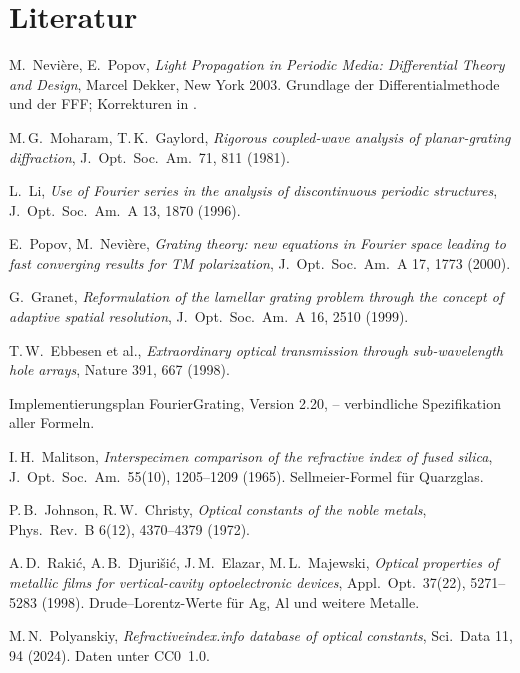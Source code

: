 \chapter{Literatur}\label{anh:literatur}
\begin{enumerate}[label={[\arabic*]},leftmargin=2.2em]
  \item M.~Nevière, E.~Popov, \emph{Light Propagation in Periodic Media: Differential Theory and Design},
        Marcel Dekker, New York 2003. Grundlage der Differentialmethode und der FFF; Korrekturen in
        .
  \item M.\,G.~Moharam, T.\,K.~Gaylord, \emph{Rigorous coupled-wave analysis of planar-grating diffraction},
        J.\ Opt.\ Soc.\ Am.\ 71, 811 (1981).
  \item L.~Li, \emph{Use of Fourier series in the analysis of discontinuous periodic structures}, J.\ Opt.\ Soc.\ Am.\
        A 13, 1870 (1996).
  \item E.~Popov, M.~Nevière, \emph{Grating theory: new equations in Fourier space leading to fast converging results
        for TM polarization}, J.\ Opt.\ Soc.\ Am.\ A 17, 1773 (2000).
  \item G.~Granet, \emph{Reformulation of the lamellar grating problem through the concept of adaptive spatial
        resolution}, J.\ Opt.\ Soc.\ Am.\ A 16, 2510 (1999).
  \item T.\,W.~Ebbesen et al., \emph{Extraordinary optical transmission through sub-wavelength hole arrays}, Nature
        391, 667 (1998).
  \item Implementierungsplan FourierGrating, Version 2.20,  -- verbindliche
        Spezifikation aller Formeln.
  \item\label{lit:malitson} I.\,H.~Malitson, \emph{Interspecimen comparison of the refractive index of fused silica},
        J.\ Opt.\ Soc.\ Am.\ 55(10), 1205--1209 (1965). Sellmeier-Formel für Quarzglas.
  \item\label{lit:jc} P.\,B.~Johnson, R.\,W.~Christy, \emph{Optical constants of the noble metals}, Phys.\ Rev.\ B
        6(12), 4370--4379 (1972).
  \item\label{lit:rakic} A.\,D.~Raki\'c, A.\,B.~Djuri\v{s}i\'c, J.\,M.~Elazar, M.\,L.~Majewski, \emph{Optical
        properties of metallic films for vertical-cavity optoelectronic devices}, Appl.\ Opt.\ 37(22), 5271--5283
        (1998). Drude--Lorentz-Werte für Ag, Al und weitere Metalle.
  \item\label{lit:rii} M.\,N.~Polyanskiy, \emph{Refractiveindex.info database of optical constants}, Sci.\ Data 11,
        94 (2024). Daten unter CC0~1.0.
\end{enumerate}
